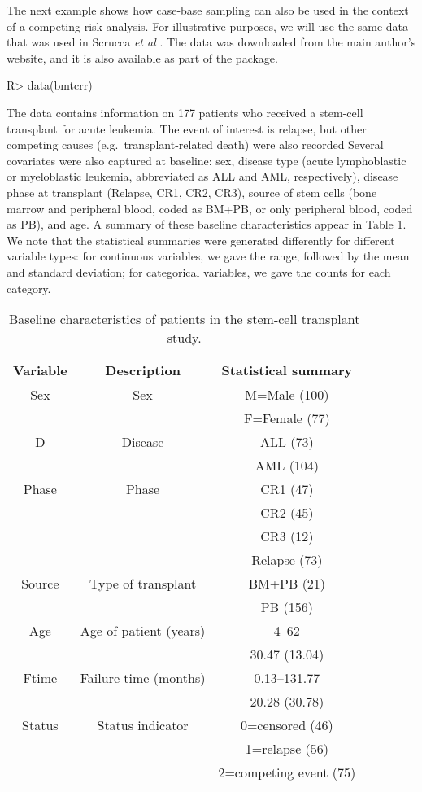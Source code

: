 \documentclass[
]{jss}
\begin{document}
The next example shows how case-base sampling can also be used in the
context of a competing risk analysis. For illustrative purposes, we will
use the same data that was used in Scrucca \emph{et al}
\citeyearpar{scrucca2010regression}. The data was downloaded from the
main author's website, and it is also available as part of the
 package.

\begin{CodeChunk}

\begin{CodeInput}
R> data(bmtcrr)
\end{CodeInput}
\end{CodeChunk}

The data contains information on 177 patients who received a stem-cell
transplant for acute leukemia. The event of interest is relapse, but
other competing causes (e.g.~transplant-related death) were also
recorded Several covariates were also captured at baseline: sex, disease
type (acute lymphoblastic or myeloblastic leukemia, abbreviated as ALL
and AML, respectively), disease phase at transplant (Relapse, CR1, CR2,
CR3), source of stem cells (bone marrow and peripheral blood, coded as
BM+PB, or only peripheral blood, coded as PB), and age. A summary of
these baseline characteristics appear in Table \ref{tab:table1bmtcrr}.
We note that the statistical summaries were generated differently for
different variable types: for continuous variables, we gave the range,
followed by the mean and standard deviation; for categorical variables,
we gave the counts for each category.

\begin{table}[ht]
\centering
\begin{tabular}{ccc}
  \hline
Variable & Description & Statistical summary \\ 
  \hline
Sex & Sex & M=Male (100) \\ 
   &  & F=Female (77) \\ 
  D & Disease & ALL (73) \\ 
   &  & AML (104) \\ 
  Phase & Phase & CR1 (47) \\ 
   &  & CR2 (45) \\ 
   &  & CR3 (12) \\ 
   &  & Relapse (73) \\ 
  Source & Type of transplant & BM+PB (21) \\ 
   &  & PB (156) \\ 
  Age & Age of patient (years) & 4–62 \\ 
   &  & 30.47 (13.04) \\ 
  Ftime & Failure time (months) & 0.13–131.77 \\ 
   &  & 20.28 (30.78) \\ 
  Status & Status indicator & 0=censored (46) \\ 
   &  & 1=relapse (56) \\ 
   &  & 2=competing event (75) \\ 
   \hline
\end{tabular}
\caption{Baseline characteristics of patients in the stem-cell transplant study.}
\label{tab:table1bmtcrr}
\end{table}
\end{document}
